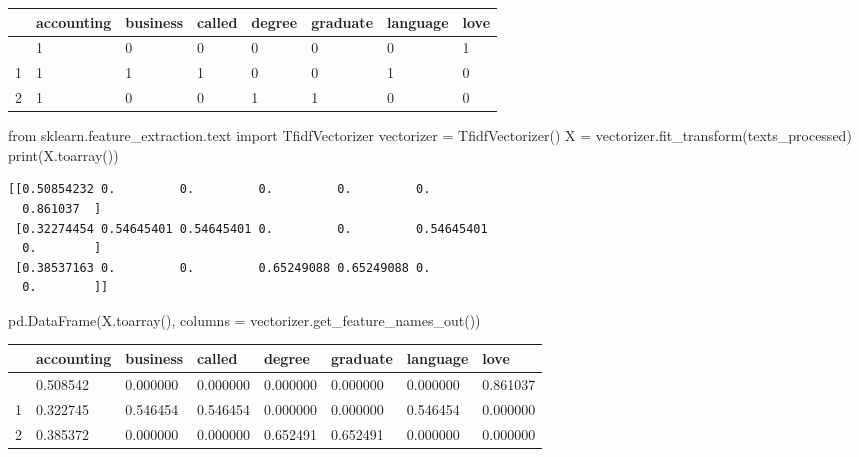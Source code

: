 \documentclass[
  letterpaper,
  DIV=11,
  numbers=noendperiod]{scrreprt}
\newenvironment{Shaded}{\begin{snugshade}}{\end{snugshade}}
\newcommand{\BuiltInTok}[1]{\textcolor[rgb]{0.00,0.23,0.31}{#1}}
\newcommand{\ImportTok}[1]{\textcolor[rgb]{0.00,0.46,0.62}{#1}}
\newcommand{\NormalTok}[1]{\textcolor[rgb]{0.00,0.23,0.31}{#1}}
\newcommand{\OperatorTok}[1]{\textcolor[rgb]{0.37,0.37,0.37}{#1}}
\newcounter{none} %
\begin{document}
{\def\LTcaptype{none} %
\begin{longtable}[]{@{}llllllll@{}}
\toprule\noalign{}
& accounting & business & called & degree & graduate & language &
love \\
\midrule\noalign{}
\endhead
\bottomrule\noalign{}
\endlastfoot
0 & 1 & 0 & 0 & 0 & 0 & 0 & 1 \\
1 & 1 & 1 & 1 & 0 & 0 & 1 & 0 \\
2 & 1 & 0 & 0 & 1 & 1 & 0 & 0 \\
\end{longtable}
}

\begin{Shaded}
\begin{Highlighting}[]
\ImportTok{from}\NormalTok{ sklearn.feature\_extraction.text }\ImportTok{import}\NormalTok{ TfidfVectorizer}
\NormalTok{vectorizer }\OperatorTok{=}\NormalTok{ TfidfVectorizer()}
\NormalTok{X }\OperatorTok{=}\NormalTok{ vectorizer.fit\_transform(texts\_processed)}
\BuiltInTok{print}\NormalTok{(X.toarray())}
\end{Highlighting}
\end{Shaded}

\begin{verbatim}
[[0.50854232 0.         0.         0.         0.         0.
  0.861037  ]
 [0.32274454 0.54645401 0.54645401 0.         0.         0.54645401
  0.        ]
 [0.38537163 0.         0.         0.65249088 0.65249088 0.
  0.        ]]
\end{verbatim}

\begin{Shaded}
\begin{Highlighting}[]
\NormalTok{pd.DataFrame(X.toarray(), }
\NormalTok{columns }\OperatorTok{=}\NormalTok{ vectorizer.get\_feature\_names\_out())}
\end{Highlighting}
\end{Shaded}

{\def\LTcaptype{none} %
\begin{longtable}[]{@{}llllllll@{}}
\toprule\noalign{}
& accounting & business & called & degree & graduate & language &
love \\
\midrule\noalign{}
\endhead
\bottomrule\noalign{}
\endlastfoot
0 & 0.508542 & 0.000000 & 0.000000 & 0.000000 & 0.000000 & 0.000000 &
0.861037 \\
1 & 0.322745 & 0.546454 & 0.546454 & 0.000000 & 0.000000 & 0.546454 &
0.000000 \\
2 & 0.385372 & 0.000000 & 0.000000 & 0.652491 & 0.652491 & 0.000000 &
0.000000 \\
\end{longtable}
}
\end{document}
